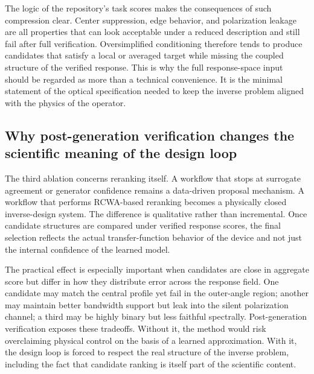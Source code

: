 The logic of the repository's task scores makes the consequences of such compression clear. Center suppression, edge behavior, and polarization leakage are all properties that can look acceptable under a reduced description and still fail after full verification. Oversimplified conditioning therefore tends to produce candidates that satisfy a local or averaged target while missing the coupled structure of the verified response. This is why the full response-space input should be regarded as more than a technical convenience. It is the minimal statement of the optical specification needed to keep the inverse problem aligned with the physics of the operator.

\subsection{Why post-generation verification changes the scientific meaning of the design loop}

The third ablation concerns reranking itself. A workflow that stops at surrogate agreement or generator confidence remains a data-driven proposal mechanism. A workflow that performs RCWA-based reranking becomes a physically closed inverse-design system. The difference is qualitative rather than incremental. Once candidate structures are compared under verified response scores, the final selection reflects the actual transfer-function behavior of the device and not just the internal confidence of the learned model.

The practical effect is especially important when candidates are close in aggregate score but differ in how they distribute error across the response field. One candidate may match the central profile yet fail in the outer-angle region; another may maintain better bandwidth support but leak into the silent polarization channel; a third may be highly binary but less faithful spectrally. Post-generation verification exposes these tradeoffs. Without it, the method would risk overclaiming physical control on the basis of a learned approximation. With it, the design loop is forced to respect the real structure of the inverse problem, including the fact that candidate ranking is itself part of the scientific content.
